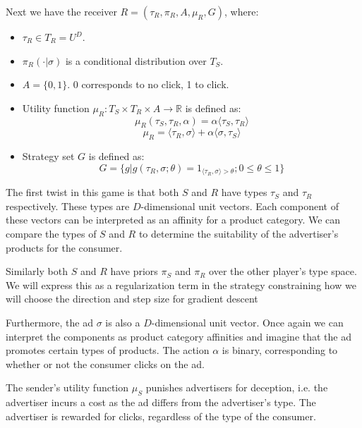 \documentclass{article}
\begin{document}
\noindent Next we have the receiver $R = (\tau_R, \pi_R, A, \mu_R, G)$, where:
\begin{itemize}
	\item $\tau_R \in T_R = U^D$.
	\item $\pi_R(\cdot|\sigma)$ is a conditional distribution over $T_S$.
	\item $A = \lbrace 0,1 \rbrace$. 0 corresponds to no click, 1 to click.
	\item Utility function $\mu_R: T_S \times T_R \times A \rightarrow \mathbb{R}$ is defined as:
	\begin{equation}
		\mu_R(\tau_S, \tau_R, \alpha) = \alpha \langle \tau_S, \tau_R \rangle
	\end{equation}
	\begin{equation}
		\mu_R = \langle \tau_R, \sigma \rangle + \alpha \langle \sigma, \tau_S \rangle
	\end{equation}
	\item Strategy set $G$ is defined as:
	\begin{equation}
		G = \lbrace g | g(\tau_R, \sigma; \theta) = 1_{\langle \tau_R, \sigma \rangle > \theta}; 0 \le \theta \le 1 \rbrace
	\end{equation}
\end{itemize}

\noindent The first twist in this game is that both $S$ and $R$ have types $\tau_S$ and $\tau_R$ respectively. These types are $D$-dimensional unit vectors. Each component of these vectors can be interpreted as an affinity for a product category. We can compare the types of $S$ and $R$ to determine the suitability of the advertiser's products for the consumer. 

Similarly both $S$ and $R$ have priors $\pi_S$ and $\pi_R$ over the other player's type space. We will express this as a regularization term in the strategy constraining how we will choose the direction and step size for gradient descent

Furthermore, the ad $\sigma$ is also a $D$-dimensional unit vector. Once again we can interpret the components as product category affinities and imagine that the ad promotes certain types of products. The action $\alpha$ is binary, corresponding to whether or not the consumer clicks on the ad.

The sender's utility function $\mu_S$ punishes advertisers for deception, i.e. the advertiser incurs a cost as the ad differs from the advertiser's type. The advertiser is rewarded for clicks, regardless of the type of the consumer.
\end{document}

